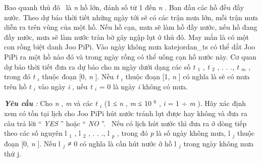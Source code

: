 Bao quanh thủ đô  là \emph{ n } hồ lớn, đánh số từ 1 đến \emph{ n } . Ban đầu các hồ đều đầy nước. Theo dự báo thời tiết những ngày tới sẽ có các trận mưa lớn, mỗi trận mưa diễn ra trên vùng của một hồ. Nếu hồ cạn, mưa sẽ làm hồ đầy nước, nếu hồ đang đầy nước, mưa sẽ làm nước tràn bờ gây ngập lụt ở thủ đô. May mắn là có một con rồng biệt danh Joo PiPi. Vào ngày không mưa katejordan\_ts có thể dắt Joo PiPi ra một hồ nào đó và trong ngày rồng có thể uống cạn hồ nước này. Cơ quan dự báo thời tiết đưa ra dự báo cho m ngày dưới dạng các số \emph{ t $_ 1 $} , \emph{ t $_ 2 $} , . . ., \emph{ t $_ m $} , trong đó \emph{ t $_ i $} thuộc đoạn [0, \emph{ n } ]. Nếu \emph{ t $_ i $} thuộc đoạn [1, \emph{ n } ] có nghĩa là sẽ có mưa trên hồ \emph{ t $_ i $} vào ngày \emph{ i } , nếu \emph{ t $_ i $} = 0 là ngày \emph{ i } không có mưa.

\emph{\textbf{Yêu cầu } : } Cho \emph{ n } , \emph{ m } và các \emph{ t $_ i $} (1 ≤ \emph{ n } , \emph{ m } ≤ 10 $^ 6 $ , \emph{ i } = 1 ÷ \emph{ m } ). Hãy xác định xem có tồn tại lịch cho Joo PiPi hút nước tránh lụt được hay không và đưa ra câu trả lời “ \emph{ YES } ” hoặc “ \emph{ NO } ”.  Nếu có lịch hút nước thì đưa ra ở dòng tiếp theo các số nguyên l $_ 1 $ , l $_ 2 $ , . . ., l \emph{$_ p $} , trong đó \emph{ p } là số ngày không mưa, l \emph{$_ j $} thuộc đoạn [0, \emph{ n } ]. Nếu l \emph{$_ j $} ≠ 0 có nghĩa là cần hút nước ở hồ l \emph{$_ j $} trong ngày không mưa thứ j.

\